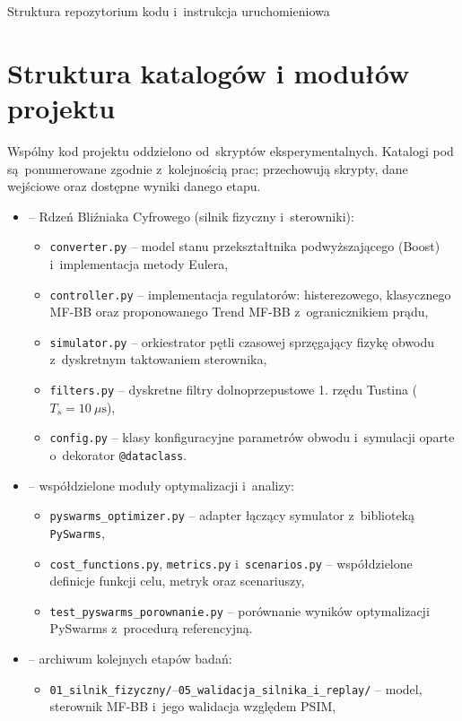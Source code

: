 \begin{easyappendix}{Struktura repozytorium kodu i~instrukcja uruchomieniowa}
\section*{Struktura katalogów i modułów projektu}
Wspólny kod projektu oddzielono od~skryptów eksperymentalnych. Katalogi pod  są~ponumerowane zgodnie z~kolejnością prac; przechowują skrypty, dane wejściowe oraz dostępne wyniki danego etapu.

\begin{itemize}
	\item {} -- Rdzeń Bliźniaka Cyfrowego (silnik fizyczny i~sterowniki):
	\begin{itemize}
		\item \texttt{converter.py} -- model stanu przekształtnika podwyższającego (Boost) i~implementacja metody Eulera,
		\item \texttt{controller.py} -- implementacja regulatorów: histerezowego, klasycznego MF-BB oraz proponowanego Trend MF-BB z~ogranicznikiem prądu,
		\item \texttt{simulator.py} -- orkiestrator pętli czasowej sprzęgający fizykę obwodu z~dyskretnym taktowaniem sterownika,
		\item \texttt{filters.py} -- dyskretne filtry dolnoprzepustowe 1. rzędu Tustina ($T_s = 10~\mu\mathrm{s}$),
		\item \texttt{config.py} -- klasy konfiguracyjne parametrów obwodu i~symulacji oparte o~dekorator \texttt{@dataclass}.
	\end{itemize}
	\item {} -- współdzielone moduły optymalizacji i~analizy:
	\begin{itemize}
		\item \texttt{pyswarms\_optimizer.py} -- adapter łączący symulator z~biblioteką \texttt{PySwarms},
				\item \texttt{cost\_functions.py}, \texttt{metrics.py} i~\texttt{scenarios.py} -- współdzielone definicje funkcji celu, metryk oraz scenariuszy,
				\item \texttt{test\_pyswarms\_porownanie.py} -- porównanie wyników optymalizacji PySwarms z~procedurą referencyjną.
	\end{itemize}
	\item {} -- archiwum kolejnych etapów badań:
	\begin{itemize}
		\item \texttt{01\_silnik\_fizyczny/}--\texttt{05\_walidacja\_silnika\_i\_replay/} -- model, sterownik MF-BB i~jego walidacja względem PSIM,

\end{itemize}
\end{itemize}
\end{easyappendix}

